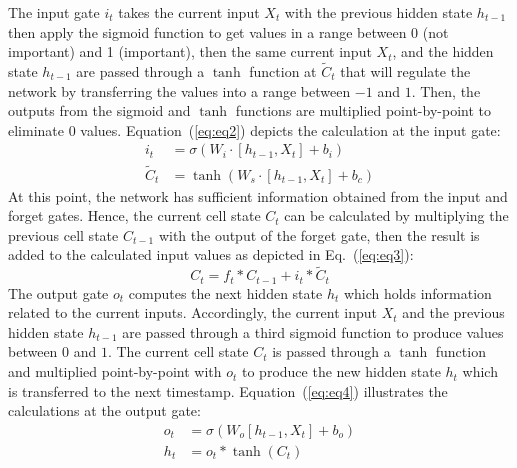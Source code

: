 The input gate \(i_{t}\) takes the current input \(X_t\) with the previous hidden state \(h_{t-1}\) then apply the sigmoid function to get values in a range between 0 (not important) and 1 (important), then the
same current input \(X_t\), and the hidden state \(h_{t-1}\) are passed through a \(\tanh\) function at \(\tilde{C}_{t}\) that will regulate the network by transferring the values into a range between \(-1\) and \(1\).
Then, the outputs from the sigmoid and \(\tanh\) functions are multiplied point-by-point to eliminate \(0\) values.  
Equation~(\ref{eq:eq2}) depicts the calculation at the input gate:
\begin{equation}
\begin{aligned}
i_{t} &=\sigma\left(W_{i} \cdot\left[h_{t-1}, X_{t}\right]+b_{i}\right) 
\\
\tilde{C}_{t} &=\tanh \left(W_{s} \cdot\left[h_{t-1}, X_{t}\right]+b_{c}\right) 
\end{aligned} \label{eq:eq2}
\end{equation}
At this point, the network has sufficient information obtained from the input and forget gates. 
Hence, the current cell state \(C_t\) can be calculated by multiplying the previous cell state \(C_{t-1}\) with the output of the forget gate, then the result is added to the calculated input values as depicted in Eq.~(\ref{eq:eq3}): 
\begin{equation}
C_{t}=f_{t} * C_{t-1}+i_{t} * \tilde{C}_{t}
\label{eq:eq3}
\end{equation}
The output gate \(o_{t}\) computes the next hidden state \(h_{t}\) which
holds information related to the current inputs. 
Accordingly, the current input \(X_{t}\) and the previous hidden state \(h_{t-1}\) are passed through a third sigmoid function to produce values between \(0\) and \(1\).
The current cell state \(C_{t}\) is passed through a \(\tanh\) function and multiplied point-by-point with \(o_{t}\) to produce the new hidden state \(h_{t}\) which is transferred to the next timestamp.
Equation~(\ref{eq:eq4}) illustrates the calculations at the output gate:
\begin{equation}
\begin{aligned}
o_{t} &=\sigma\left(W_{o}\left[h_{t-1}, X_{t}\right]+b_{o}\right) \\
h_{t} &=o_{t} * \tanh \left(C_{t}\right)
\end{aligned}
\label{eq:eq4}
\end{equation} 

